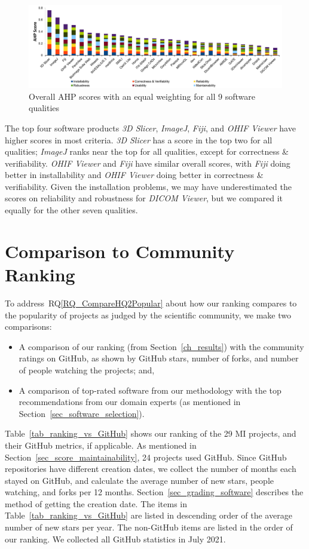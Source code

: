 \documentclass[11pt]{article}
\newcommand{\rqref}[1]{RQ\ref{#1}}
\begin{document}
\begin{figure}[!ht]
\includegraphics[scale=0.47]{overall_scores.pdf}
\caption{Overall AHP scores with an equal weighting for all 9 software qualities}

\label{fg_overall_scores}
\end{figure}

The top four software products \textit{3D Slicer}, \textit{ImageJ},
\textit{Fiji}, and \textit{OHIF Viewer} have higher scores in most criteria.
\textit{3D Slicer} has a score in the top two for all qualities; \textit{ImageJ}
ranks near the top for all qualities, except for correctness \& verifiability.
\textit{OHIF Viewer} and \textit{Fiji} have similar overall scores, with
\textit{Fiji} doing better in installability and \textit{OHIF Viewer} doing
better in correctness \& verifiability.  Given the installation problems, we may
have underestimated the scores on reliability and robustness for \textit{DICOM
Viewer}, but we compared it equally for the other seven qualities.

\section{Comparison to Community Ranking} \label{Sec_VsCommunityRanking}

To address~\rqref{RQ_CompareHQ2Popular} about how our ranking compares to the
popularity of projects as judged by the scientific community, we make two
comparisons:
\begin{itemize}
\item A comparison of our ranking (from Section~\ref{ch_results}) with the
community ratings on GitHub, as shown by GitHub stars, number of forks, and
number of people watching the projects; and,
\item A comparison of top-rated software from our methodology with the top
recommendations from our domain experts (as mentioned in
Section~\ref{sec_software_selection}).
\end{itemize}

Table~\ref{tab_ranking_vs_GitHub} shows our ranking of the 29 MI projects, and
their GitHub metrics, if applicable. As mentioned in
Section~\ref{sec_score_maintainability}, 24 projects used GitHub. Since GitHub
repositories have different creation dates, we collect the number of months each
stayed on GitHub, and calculate the average number of new stars, people
watching, and forks per 12 months. Section~\ref{sec_grading_software} describes
the method of getting the creation date.  The items in
Table~\ref{tab_ranking_vs_GitHub} are listed in descending order of the average
number of new stars per year.  The non-GitHub items are listed in the order of
our ranking.  We collected all GitHub statistics in July 2021.  
\end{document}
